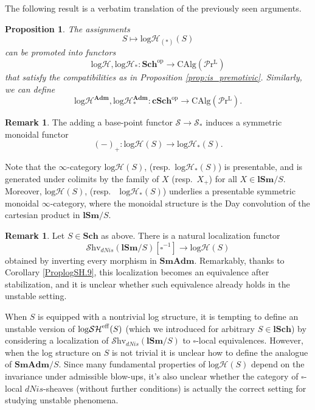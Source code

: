\documentclass[11pt, a4paper]{amsart}
\newtheorem{prop}[thm]{Proposition}
\theoremstyle{definition}
\newtheorem{rmk}[thm]{Remark}
\numberwithin{equation}{subsection}
\newcommand{\Sch}{\mathbf{Sch}}
\newcommand{\lSch}{\mathbf{lSch}}
\newcommand{\lSm}{\mathbf{lSm}}
\newcommand{\cSch}{\mathbf{cSch}}
\newcommand{\Adm}{\mathbf{Adm}}
\newcommand{\SmAdm}{\mathbf{SmAdm}}
\newcommand{\boxx}{\square}
\newcommand{\eff}{{\rm eff}}
\newcommand{\infSpc}{\mathcal{S}}
\newcommand{\infShv}{\mathcal{S}\mathrm{hv}}
\newcommand{\LPr}{\mathcal{P}\mathrm{r}^{\mathrm{L}}}
\newcommand{\CAlg}{\mathrm{CAlg}}
\newcommand{\inflogH}{\mathrm{log}\mathcal{H}}
\newcommand{\inflogHpt}{\mathrm{log}\mathcal{H}_\ast}
\newcommand{\inflogSH}{\mathrm{log}\mathcal{SH}}
\begin{document}
The following result is a verbatim translation of the previously seen arguments. 
\begin{prop} \label{logH.9} The assignments 
\[
S\mapsto \inflogH_{(\ast)}(S)
\]
can be promoted into functors 
\[
\inflogH,
\inflogH_{\ast}
\colon
 \Sch^\mathrm{op}\to \CAlg(\LPr)
\]
that
satisfy the compatibilities as in Proposition \ref{prop:is_premotivic}.
Similarly, we can define \index[notation]{logHAdm @ $\inflogH^{\Adm}$}\index[notation]{logHptAdm @ $\inflogHpt^{\Adm}$}
\[
\inflogH^{\Adm},
\inflogH_{\ast}^{\Adm}
\colon
\cSch^\mathrm{op}
\to
\CAlg(\LPr).
\]
\end{prop}

\begin{rmk}\label{rmk:base_point}
The adding a base-point functor $\infSpc\to \infSpc_*$   induces a symmetric monoidal functor 
\[(-)_+\colon \inflogH(S) \to \inflogH_{\ast}(S).\]

Note that the $\infty$-category $\inflogH(S)$, (resp.\  $\inflogH_{\ast}(S)$) is presentable, and is generated under colimits by the family of $X$ (resp.\ $X_+$) for all $X\in \lSm/S$. Moreover, $\inflogH(S)$, (resp.\ \ $\inflogH_{\ast}(S)$) underlies a presentable symmetric monoidal $\infty$-category, where the monoidal structure is the Day convolution of the cartesian product in $\lSm/S$.
\end{rmk}


\begin{rmk}
\label{rmk:unclearequivalence}
Let $S\in \Sch$ as above. 
There is a natural localization functor
\[
\infShv_{dNis}(\lSm/S)[\boxx^{-1}]\to \inflogH(S)
\]
obtained by inverting every morphism in $\SmAdm$. Remarkably, thanks to Corollary \ref{ProplogSH.9}, this localization becomes an equivalence after stabilization, and it is unclear  whether such equivalence already holds in the unstable setting. 

When $S$ is equipped with a nontrivial log structure, it is tempting to define an unstable version of $\inflogSH^{\eff}(S)$ (which we introduced for arbitrary $S\in \lSch$) by considering a localization of $\infShv_{dNis}(\lSm/S)$ to $\boxx$-local equivalences. However, when the log structure on $S$ is not trivial it is unclear how to define the analogue of $\SmAdm/S$. Since many fundamental properties of $\inflogH(S)$ depend on the invariance under admissible blow-ups, it's also unclear whether the category of $\boxx$-local $dNis$-sheaves (without further conditions) is actually the correct setting for studying unstable phenomena.
\end{rmk}
\end{document}
